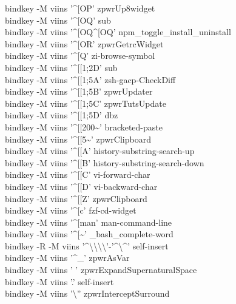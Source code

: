 \documentclass[11pt,a4paper,twoside]{book}
\begin{document}
bindkey -M viins '\textasciicircum{}[OP' zpwrUp8widget\\
bindkey -M viins '\textasciicircum{}[OQ' sub\\
bindkey -M viins '\textasciicircum{}[OQ\textasciicircum{}[OQ' npm\_toggle\_install\_uninstall\\
bindkey -M viins '\textasciicircum{}[OR' zpwrGetrcWidget\\
bindkey -M viins '\textasciicircum{}[Q' zi-browse-symbol\\
bindkey -M viins '\textasciicircum{}[[1;2D' sub\\
bindkey -M viins '\textasciicircum{}[[1;5A' zsh-gacp-CheckDiff\\
bindkey -M viins '\textasciicircum{}[[1;5B' zpwrUpdater\\
bindkey -M viins '\textasciicircum{}[[1;5C' zpwrTutsUpdate\\
bindkey -M viins '\textasciicircum{}[[1;5D' dbz\\
bindkey -M viins '\textasciicircum{}[[200\textasciitilde{}' bracketed-paste\\
bindkey -M viins '\textasciicircum{}[[5\textasciitilde{}' zpwrClipboard\\
bindkey -M viins '\textasciicircum{}[[A' history-substring-search-up\\
bindkey -M viins '\textasciicircum{}[[B' history-substring-search-down\\
bindkey -M viins '\textasciicircum{}[[C' vi-forward-char\\
bindkey -M viins '\textasciicircum{}[[D' vi-backward-char\\
bindkey -M viins '\textasciicircum{}[[Z' zpwrClipboard\\
bindkey -M viins '\textasciicircum{}[c' fzf-cd-widget\\
bindkey -M viins '\textasciicircum{}[man' man-command-line\\
bindkey -M viins '\textasciicircum{}[\textasciitilde{}' \_bash\_complete-word\\
bindkey -R -M viins '\textasciicircum{}\textbackslash{}\textbackslash{}\textbackslash{}\textbackslash{}'-'\textasciicircum{}\textbackslash{}\textasciicircum{}' self-insert\\
bindkey -M viins '\textasciicircum{}\_' zpwrAsVar\\
bindkey -M viins ' ' zpwrExpandSupernaturalSpace\\
bindkey -M viins '.' self-insert\\
bindkey -M viins '\textbackslash{}'' zpwrInterceptSurround\\
\end{document}
